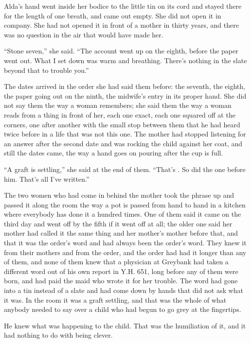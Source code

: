 Alda's hand went inside her bodice to the little tin on its cord and stayed there for the length of one breath, and came out empty. She did not open it in company. She had not opened it in front of a mother in thirty years, and there was no question in the air that would have made her.

“Stone seven,” she said. “The account went up on the eighth, before the paper went out. What I set down was warm and breathing. There's nothing in the slate beyond that to trouble you.”

The dates arrived in the order she had said them before: the seventh, the eighth, the paper going out on the ninth, the midwife's entry in its proper hand. She did not say them the way a woman remembers; she said them the way a woman reads from a thing in front of her, each one exact, each one squared off at the corners, one after another with the small stop between them that he had heard twice before in a life that was not this one. The mother had stopped listening for an answer after the second date and was rocking the child against her coat, and still the dates came, the way a hand goes on pouring after the cup is full.

“A graft is settling,” she said at the end of them. “That's . So did the one before him. That's all I've written.”

The two women who had come in behind the mother took the phrase up and passed it along the room the way a pot is passed from hand to hand in a kitchen where everybody has done it a hundred times. One of them said it came on the third day and went off by the fifth if it went off at all; the older one said her mother had called it the same thing and her mother's mother before that, and that it was the order's word and had always been the order's word. They knew it from their mothers and from the order, and the order had had it longer than any of them, and none of them knew that a physician at Greybank had taken a different word out of his own report in Y.H. 651, long before any of them were born, and had paid the maid who wrote it for her trouble. The word had gone into a tin instead of a slate and had come down by hands that did not ask what it was. In the room it was a graft settling, and that was the whole of what anybody needed to say over a child who had begun to go grey at the fingertips.

\scenebreak

He knew what was happening to the child. That was the humiliation of it, and it had nothing to do with being clever.


